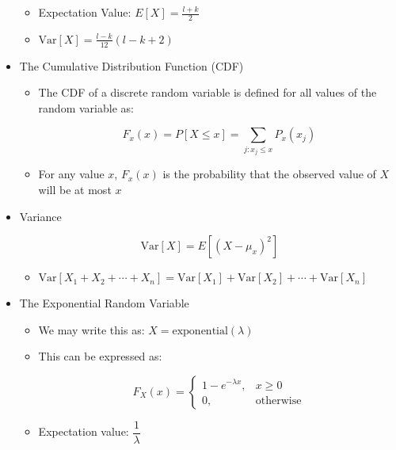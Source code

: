 \begin{itemize}
\begin{itemize}
        \item Expectation Value: $E[X]=\frac{l+k}{2}$

        \item $\text{Var}[X]=\frac{l-k}{12}(l-k+2)$

    \end{itemize}

  \item The Cumulative Distribution Function (CDF)

    \begin{itemize}

      \item The CDF of a discrete random variable is defined for all values of the random variable as:

        $$F_x(x)=P[X\leq x]=\sum_{j:x_j\leq x}P_x(x_j)$$

      \item For any value $x$, $F_x(x)$ is the probability that the observed value of $X$ will be at most $x$

    \end{itemize}

  \item Variance

    $$\text{Var}[X]=E[(X-\mu_x)^2]$$

    \begin{itemize}

      \item $\text{Var}[X_1+X_2+\cdots+X_n]=\text{Var}[X_1]+\text{Var}[X_2]+\cdots+\text{Var}[X_n]$

    \end{itemize}

  \item The Exponential Random Variable

    \begin{itemize}

      \item We may write this as: $X=\text{exponential}(\lambda)$

      \item This can be expressed as:

        $$F_X(x)=\left\{ \begin{array}{ll} 1-e^{-\lambda x}, & x\geq0\\ 0,&\text{otherwise}\end{array}$$

      \item Expectation value: $\dfrac{1}{\lambda}$


\end{itemize}
\end{itemize}
